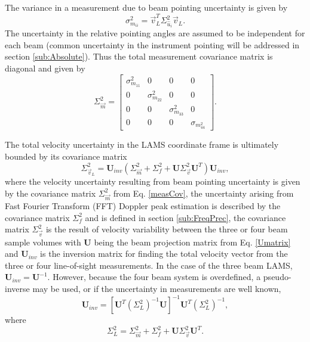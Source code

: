 \documentclass[12pt,twoside,english]{article}\usepackage[]{graphicx}\usepackage[]{color}
\begin{document}
The variance in a measurement due to beam pointing uncertainty is given by  
\begin{equation}
\sigma_{m_{ii}}^{2}=\vec{v}_{L}^{T}\Sigma_{\hat{u}_{i}}^{2}\vec{v}_{L}.\label{measUncert} 
\end{equation}
The uncertainty in the relative pointing angles are assumed to be independent for each beam (common uncertainty in the instrument pointing will be addressed in section \ref{sub:Absolute}). Thus the total measurement covariance matrix is diagonal and given by  
\begin{equation}
\Sigma_{\vec{m}}^2=\left[\begin{array}{cccc} \sigma_{m_{11}}^2 & 0 & 0 & 0 \\                                                  0 & \sigma_{m_{22}}^2 & 0 & 0 \\                                                 0 & 0 & \sigma_{m_{33}}^2 & 0 \\                                                 0 & 0 & 0 & \sigma_{m_{44}^2} \end{array} \right].\label{measCov} 
\end{equation}

The total velocity uncertainty in the LAMS coordinate frame is ultimately bounded by its covariance matrix  
\begin{equation}
\Sigma_{\vec{v}_{L}}^{2}=\mathbf{U}_{inv}\left(\Sigma_{\vec{m}}^{2}+\Sigma_{f}^{2}+\mathbf{U}\Sigma_{\vec{v}}^{2}\mathbf{U}^{T}\right)\mathbf{U}_{inv},\label{VlamsError} 
\end{equation}
where the velocity uncertainty resulting from beam pointing uncertainty is given by the covariance matrix $\Sigma_{\vec{m}}^{2}$ from Eq.  \eqref{measCov}, the uncertainty arising from Fast Fourier Transform (FFT) Doppler peak estimation is described by the covariance matrix $\Sigma_{f}^{2}$ and is defined in section \ref{sub:FreqPrec}, the covariance matrix $\Sigma_{\vec{v}}^{2}$ is the result of velocity variability between the three or four beam sample volumes with $\mathbf{U}$ being the beam projection matrix from Eq. \eqref{Umatrix} and $\mathbf{U}_{inv}$ is the inversion matrix for finding the total velocity vector from the three or four line-of-sight measurements. In the case of the three beam LAMS, $\mathbf{U}_{inv}=\mathbf{U}^{-1}$.  However, because the four beam system is overdefined, a pseudo-inverse may be used, or if the uncertainty in measurements are well known, 
\begin{equation}
\mathbf{U}_{inv}=\left[\mathbf{U}^{T}\left(\Sigma_{L}^{2}\right)^{-1}\mathbf{U}\right]^{-1}\mathbf{U}^{T}\left(\Sigma_{L}^{2}\right)^{-1},\label{OptInv}
\end{equation}
where  
\begin{equation}
\Sigma_{L}^{2}=\Sigma_{\vec{m}}^{2}+\Sigma_{f}^{2}+\mathbf{U}\Sigma_{\vec{v}}^{2}\mathbf{U}^{T}.\label{TotalMeasUncert} 
\end{equation}
\end{document}
